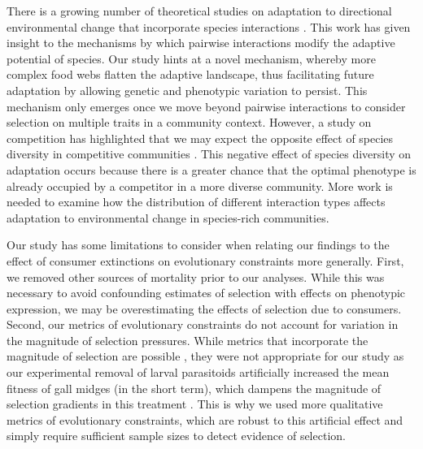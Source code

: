 \documentclass[11pt,]{article}
\begin{document}
There is a growing number of theoretical studies on adaptation to
directional environmental change that incorporate species interactions
\citep[e.g.][]{deMazancourt2008, Johansson2008, Norberg2012, Osmond2017PredatorsHelpPrey}.
This work has given insight to the mechanisms by which pairwise
interactions modify the adaptive potential of species. Our study hints
at a novel mechanism, whereby more complex food webs flatten the
adaptive landscape, thus facilitating future adaptation by allowing
genetic and phenotypic variation to persist. This mechanism only emerges
once we move beyond pairwise interactions to consider selection on
multiple traits in a community context. However, a study on competition
has highlighted that we may expect the opposite effect of species
diversity in competitive communities \citep{deMazancourt2008}. This
negative effect of species diversity on adaptation occurs because there
is a greater chance that the optimal phenotype is already occupied by a
competitor in a more diverse community. More work is needed to examine
how the distribution of different interaction types affects adaptation
to environmental change in species-rich communities.

Our study has some limitations to consider when relating our findings to
the effect of consumer extinctions on evolutionary constraints more
generally. First, we removed other sources of mortality prior to our
analyses. While this was necessary to avoid confounding estimates of
selection with effects on phenotypic expression, we may be
overestimating the effects of selection due to consumers. Second, our
metrics of evolutionary constraints do not account for variation in the
magnitude of selection pressures. While metrics that incorporate the
magnitude of selection are possible \citep{Hansen2008}, they were not
appropriate for our study as our experimental removal of larval
parasitoids artificially increased the mean fitness of gall midges (in
the short term), which dampens the magnitude of selection gradients in
this treatment \citep{Hunter2018}. This is why we used more qualitative
metrics of evolutionary constraints, which are robust to this artificial
effect and simply require sufficient sample sizes to detect evidence of
selection.
\end{document}

